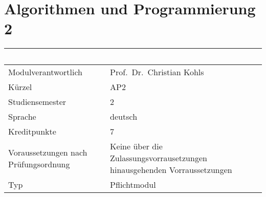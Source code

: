 \chapter{Algorithmen und Programmierung
2}\label{algorithmen-und-programmierung-2}

\begin{longtable}[]{@{}ll@{}}
\toprule
\begin{minipage}[b]{0.12\columnwidth}\raggedright\strut
~\strut
\end{minipage} & \begin{minipage}[b]{0.12\columnwidth}\raggedright\strut
~\strut
\end{minipage}\tabularnewline
\midrule
\endhead
\begin{minipage}[t]{0.12\columnwidth}\raggedright\strut
Modulverantwortlich\strut
\end{minipage} & \begin{minipage}[t]{0.12\columnwidth}\raggedright\strut
Prof.~Dr.~Christian Kohls\strut
\end{minipage}\tabularnewline
\begin{minipage}[t]{0.12\columnwidth}\raggedright\strut
Kürzel\strut
\end{minipage} & \begin{minipage}[t]{0.12\columnwidth}\raggedright\strut
AP2\strut
\end{minipage}\tabularnewline
\begin{minipage}[t]{0.12\columnwidth}\raggedright\strut
Studiensemester\strut
\end{minipage} & \begin{minipage}[t]{0.12\columnwidth}\raggedright\strut
2\strut
\end{minipage}\tabularnewline
\begin{minipage}[t]{0.12\columnwidth}\raggedright\strut
Sprache\strut
\end{minipage} & \begin{minipage}[t]{0.12\columnwidth}\raggedright\strut
deutsch\strut
\end{minipage}\tabularnewline
\begin{minipage}[t]{0.12\columnwidth}\raggedright\strut
Kreditpunkte\strut
\end{minipage} & \begin{minipage}[t]{0.12\columnwidth}\raggedright\strut
7\strut
\end{minipage}\tabularnewline
\begin{minipage}[t]{0.12\columnwidth}\raggedright\strut
Voraussetzungen nach Prüfungsordnung\strut
\end{minipage} & \begin{minipage}[t]{0.12\columnwidth}\raggedright\strut
Keine über die Zulassungsvorrausetzungen hinausgehenden
Vorraussetzungen\strut
\end{minipage}\tabularnewline
\begin{minipage}[t]{0.12\columnwidth}\raggedright\strut
Typ\strut
\end{minipage} & \begin{minipage}[t]{0.12\columnwidth}\raggedright\strut
Pflichtmodul\strut
\end{minipage}\tabularnewline
\bottomrule
\end{longtable}

